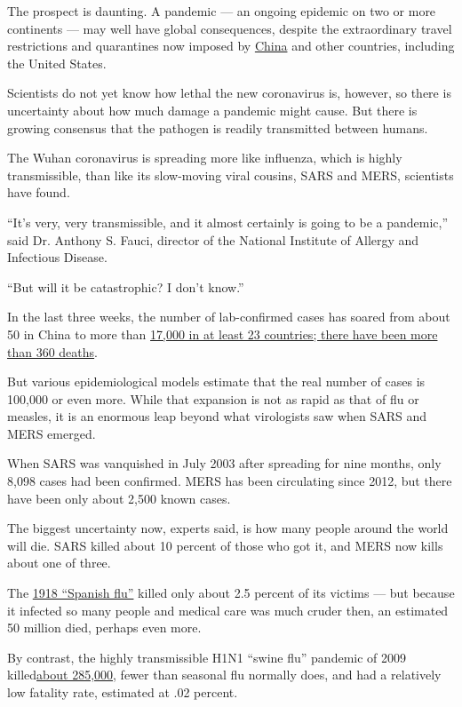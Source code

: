 The prospect is daunting. A pandemic --- an ongoing epidemic on two or
more continents --- may well have global consequences, despite the
extraordinary travel restrictions and quarantines now imposed by
\href{https://www.nytimes3xbfgragh.onion/2020/02/20/world/asia/japan-coronavirus-clusters.html}{China}
and other countries, including the United States.

Scientists do not yet know how lethal the new coronavirus is, however,
so there is uncertainty about how much damage a pandemic might cause.
But there is growing consensus that the pathogen is readily transmitted
between humans.

The Wuhan coronavirus is spreading more like influenza, which is highly
transmissible, than like its slow-moving viral cousins, SARS and MERS,
scientists have found.

``It's very, very transmissible, and it almost certainly is going to be
a pandemic,'' said Dr. Anthony S. Fauci, director of the National
Institute of Allergy and Infectious Disease.

``But will it be catastrophic? I don't know.''

In the last three weeks, the number of lab-confirmed cases has soared
from about 50 in China to more than
\href{https://www.nytimes3xbfgragh.onion/2020/02/02/world/asia/china-coronavirus.html}{17,000
in at least 23 countries; there have been more than 360 deaths}.

But various epidemiological models estimate that the real number of
cases is 100,000 or even more. While that expansion is not as rapid as
that of flu or measles, it is an enormous leap beyond what virologists
saw when SARS and MERS emerged.

When SARS was vanquished in July 2003 after spreading for nine months,
only 8,098 cases had been confirmed. MERS has been circulating since
2012, but there have been only about 2,500 known cases.

The biggest uncertainty now, experts said, is how many people around the
world will die. SARS killed about 10 percent of those who got it, and
MERS now kills about one of three.

The \href{https://wwwnc.cdc.gov/eid/article/12/1/05-0979_article}{1918
``Spanish flu''} killed only about 2.5 percent of its victims --- but
because it infected so many people and medical care was much cruder
then, an estimated 50 million died, perhaps even more.

By contrast, the highly transmissible H1N1 ``swine flu'' pandemic of
2009
killed\href{https://www.thelancet.com/journals/laninf/article/PIIS1473-3099(12)70121-4/fulltext}{about
285,000}, fewer than seasonal flu normally does, and had a relatively
low fatality rate, estimated at .02 percent.

